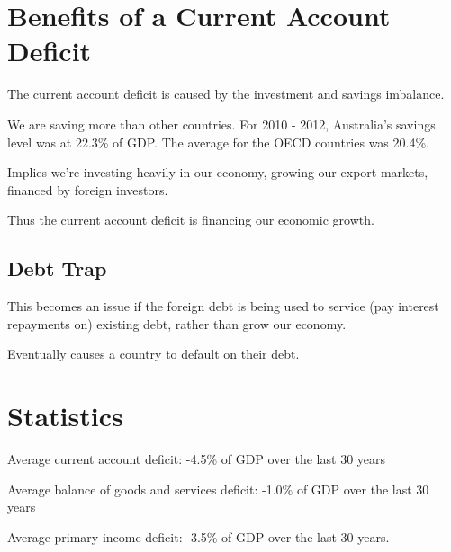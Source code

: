 \documentclass[a4paper,11pt]{article}
\begin{document}
\section{Benefits of a Current Account Deficit}

The current account deficit is caused by the investment and savings imbalance.

We are saving more than other countries. For 2010 - 2012, Australia's savings
level was at 22.3\% of GDP. The average for the OECD countries was 20.4\%.

Implies we're investing heavily in our economy, growing our export markets,
financed by foreign investors.

Thus the current account deficit is financing our economic growth.


\subsection{Debt Trap}

This becomes an issue if the foreign debt is being used to service (pay
interest repayments on) existing debt, rather than grow our economy.

Eventually causes a country to default on their debt.




\section{Statistics}

Average current account deficit: -4.5\% of GDP over the last 30 years

Average balance of goods and services deficit: -1.0\% of GDP over the last 30
years

Average primary income deficit: -3.5\% of GDP over the last 30 years.
\end{document}
